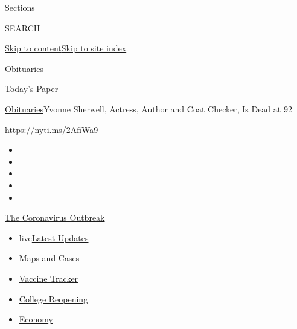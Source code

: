 Sections

SEARCH

\protect\hyperlink{site-content}{Skip to
content}\protect\hyperlink{site-index}{Skip to site index}

\href{https://www.nytimes.com/section/obituaries}{Obituaries}

\href{https://myaccount.nytimes.com/auth/login?response_type=cookie\&client_id=vi}{}

\href{https://www.nytimes.com/section/todayspaper}{Today's Paper}

\href{/section/obituaries}{Obituaries}\textbar{}Yvonne Sherwell,
Actress, Author and Coat Checker, Is Dead at 92

\url{https://nyti.ms/2AfiWa9}

\begin{itemize}
\item
\item
\item
\item
\item
\end{itemize}

\href{https://www.nytimes.com/news-event/coronavirus?action=click\&pgtype=Article\&state=default\&region=TOP_BANNER\&context=storylines_menu}{The
Coronavirus Outbreak}

\begin{itemize}
\tightlist
\item
  live\href{https://www.nytimes.com/2020/08/03/world/coronavirus-covid-19.html?action=click\&pgtype=Article\&state=default\&region=TOP_BANNER\&context=storylines_menu}{Latest
  Updates}
\item
  \href{https://www.nytimes.com/interactive/2020/us/coronavirus-us-cases.html?action=click\&pgtype=Article\&state=default\&region=TOP_BANNER\&context=storylines_menu}{Maps
  and Cases}
\item
  \href{https://www.nytimes.com/interactive/2020/science/coronavirus-vaccine-tracker.html?action=click\&pgtype=Article\&state=default\&region=TOP_BANNER\&context=storylines_menu}{Vaccine
  Tracker}
\item
  \href{https://www.nytimes.com/2020/08/02/us/covid-college-reopening.html?action=click\&pgtype=Article\&state=default\&region=TOP_BANNER\&context=storylines_menu}{College
  Reopening}
\item
  \href{https://www.nytimes.com/live/2020/08/03/business/stock-market-today-coronavirus?action=click\&pgtype=Article\&state=default\&region=TOP_BANNER\&context=storylines_menu}{Economy}
\end{itemize}

